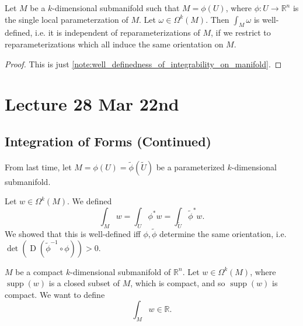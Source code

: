 \documentclass[notoc,notitlepage]{tufte-book}
\DeclareMathOperator{\D}{D}
\DeclareMathOperator{\supp}{supp}
\begin{document}
\begin{crly}\label{crly:well_definedness_of_the_integral_over_manifolds_with_a_single_parameterization}
  Let $M$ be a $k$-dimensional submanifold such that $M = \phi(U)$, where $\phi
  : U \to \mathbb{R}^n$ is the single local parameterzation of $M$. Let $\omega
  \in \Omega^k(M)$. Then $\int_{M} \omega$ is well-defined, i.e. it is
  independent of reparameterizations of $M$, if we restrict to
  reparameterizations which all induce the same orientation on $M$.
\end{crly}

\begin{proof}
  This is just \cref{note:well_definedness_of_integrability_on_manifold}.
\end{proof}



\chapter{Lecture 28 Mar 22nd}%
\label{chp:lecture_28_mar_22nd}

\section{Integration of Forms (Continued)}%
\label{sec:integration_of_forms_continued}

From last time, let $M = \phi(U) = \tilde{\phi}(\tilde{U})$ be a parameterized
$k$-dimensional submanifold.

Let $w \in \Omega^k(M)$. We defined
\begin{equation*}
  \int_{M} w = \int_{U} \phi^* w = \int_{\tilde{U}} \tilde{\phi}^* w .
\end{equation*}
We showed that this is well-defined iff $\phi, \tilde{\phi}$ determine the same
orientation, i.e. $\det (\D (\tilde{\phi}^{-1} \circ \phi)) > 0$.

 $M$ be a compact $k$-dimensional submanifold of
$\mathbb{R}^n$. Let $w \in \Omega^k(M)$, where $\supp(w)$ is a closed subset of
$M$, which is compact, and so $\supp(w)$ is compact. We want to define
\begin{equation*}
  \int_{M} w \in \mathbb{R}.
\end{equation*}
\end{document}

